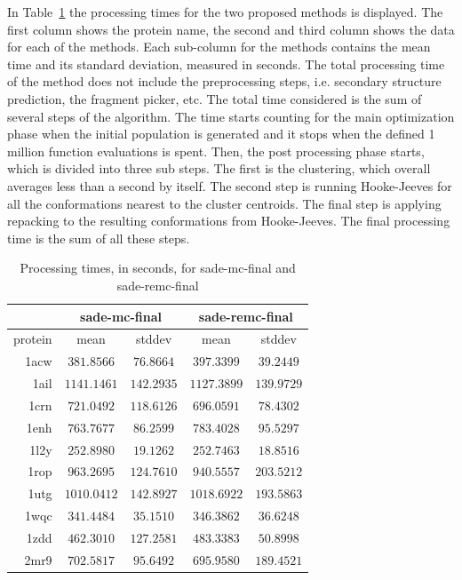 In Table~\ref{tab:processing-times} the processing times for the two proposed
methods is displayed. The first column shows the protein name, the second and
third column shows the data for each of the methods. Each sub-column for the
methods contains the mean time and its standard deviation, measured in seconds.
The total processing time of the method does not include the preprocessing
steps, i.e. secondary structure prediction, the fragment picker, etc. The total
time considered is the sum of several steps of the algorithm. The time starts
counting for the main optimization phase when the initial population is
generated and it stops when the defined 1 million function evaluations is
spent. Then, the post processing phase starts, which is divided into three
sub steps. The first is the clustering, which overall averages less than a
second by itself. The second step is running Hooke-Jeeves for all the
conformations nearest to the cluster centroids. The final step is applying
repacking to the resulting conformations from Hooke-Jeeves. The final
processing time is the sum of all these steps.

\begin{table}
  \centering
  \begin{tabular}{r|c|c||c|c}
            & \multicolumn{2}{c}{sade-mc-final} & \multicolumn{2}{||c}{sade-remc-final} \\ \hline
    protein & mean & stddev & mean & stddev \\ \hline \hline
    1acw & $ 381.8566$ & $ 76.8664$ & $ 397.3399$ & $ 39.2449$ \\ \hline
    1ail & $1141.1461$ & $142.2935$ & $1127.3899$ & $139.9729$ \\ \hline
    1crn & $ 721.0492$ & $118.6126$ & $ 696.0591$ & $ 78.4302$ \\ \hline
    1enh & $ 763.7677$ & $ 86.2599$ & $ 783.4028$ & $ 95.5297$ \\ \hline
    1l2y & $ 252.8980$ & $ 19.1262$ & $ 252.7463$ & $ 18.8516$ \\ \hline
    1rop & $ 963.2695$ & $124.7610$ & $ 940.5557$ & $203.5212$ \\ \hline
    1utg & $1010.0412$ & $142.8927$ & $1018.6922$ & $193.5863$ \\ \hline
    1wqc & $ 341.4484$ & $ 35.1510$ & $ 346.3862$ & $ 36.6248$ \\ \hline
    1zdd & $ 462.3010$ & $127.2581$ & $ 483.3383$ & $ 50.8998$ \\ \hline
    2mr9 & $ 702.5817$ & $ 95.6492$ & $ 695.9580$ & $189.4521$ \\ \hline
  \end{tabular}
  \caption{Processing times, in seconds, for sade-mc-final and sade-remc-final}
  \label{tab:processing-times}
\end{table}

